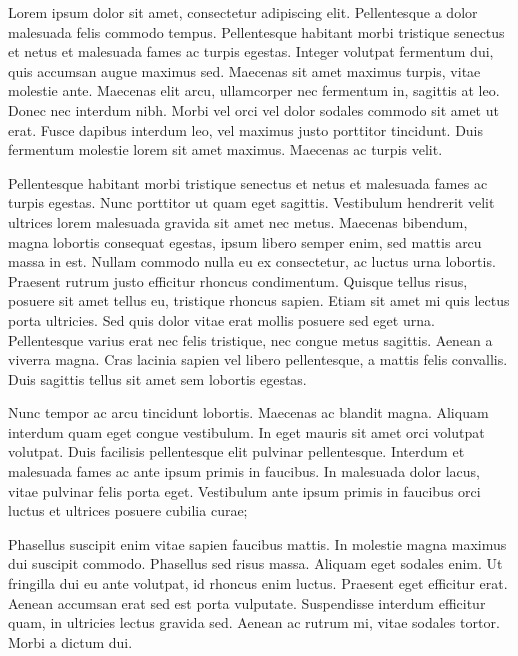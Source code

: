 \documentclass[10pt,twocolumn]{article}
\begin{document}
Lorem ipsum dolor sit amet, consectetur adipiscing elit. Pellentesque a dolor malesuada felis commodo tempus. Pellentesque habitant morbi tristique senectus et netus et malesuada fames ac turpis egestas. Integer volutpat fermentum dui, quis accumsan augue maximus sed. Maecenas sit amet maximus turpis, vitae molestie ante. Maecenas elit arcu, ullamcorper nec fermentum in, sagittis at leo. Donec nec interdum nibh. Morbi vel orci vel dolor sodales commodo sit amet ut erat. Fusce dapibus interdum leo, vel maximus justo porttitor tincidunt. Duis fermentum molestie lorem sit amet maximus. Maecenas ac turpis velit.

Pellentesque habitant morbi tristique senectus et netus et malesuada fames ac turpis egestas. Nunc porttitor ut quam eget sagittis. Vestibulum hendrerit velit ultrices lorem malesuada gravida sit amet nec metus. Maecenas bibendum, magna lobortis consequat egestas, ipsum libero semper enim, sed mattis arcu massa in est. Nullam commodo nulla eu ex consectetur, ac luctus urna lobortis. Praesent rutrum justo efficitur rhoncus condimentum. Quisque tellus risus, posuere sit amet tellus eu, tristique rhoncus sapien. Etiam sit amet mi quis lectus porta ultricies. Sed quis dolor vitae erat mollis posuere sed eget urna. Pellentesque varius erat nec felis tristique, nec congue metus sagittis. Aenean a viverra magna. Cras lacinia sapien vel libero pellentesque, a mattis felis convallis. Duis sagittis tellus sit amet sem lobortis egestas.

Nunc tempor ac arcu tincidunt lobortis. Maecenas ac blandit magna. Aliquam interdum quam eget congue vestibulum. In eget mauris sit amet orci volutpat volutpat. Duis facilisis pellentesque elit pulvinar pellentesque. Interdum et malesuada fames ac ante ipsum primis in faucibus. In malesuada dolor lacus, vitae pulvinar felis porta eget. Vestibulum ante ipsum primis in faucibus orci luctus et ultrices posuere cubilia curae;

Phasellus suscipit enim vitae sapien faucibus mattis. In molestie magna maximus dui suscipit commodo. Phasellus sed risus massa. Aliquam eget sodales enim. Ut fringilla dui eu ante volutpat, id rhoncus enim luctus. Praesent eget efficitur erat. Aenean accumsan erat sed est porta vulputate. Suspendisse interdum efficitur quam, in ultricies lectus gravida sed. Aenean ac rutrum mi, vitae sodales tortor. Morbi a dictum dui.
\end{document}
